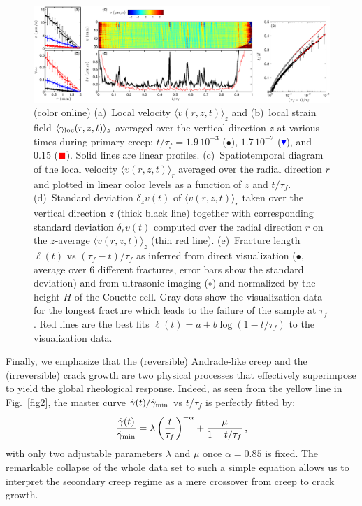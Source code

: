 \documentclass[twocolumn,superscriptaddress,showpacs,preprintnumbers,amsmath,amssymb,prl]{revtex4}
\newcommand\gp{\dot\gamma}
\newcommand\gl{\gamma_{\rm loc}}
\begin{document}
\begin{figure}
\centering
\includegraphics[width=17.5cm,clip]{Fig4.eps}
\caption{(color online) (a)~Local velocity $\langle v(r,z,t)\rangle_z$ and (b)~local strain field $\langle\gl(r,z,t)\rangle_z$ averaged over the vertical direction $z$ at various times during primary creep: $t/\tau_f=1.9\,10^{-3}$ ($\bullet$), $1.7\,10^{-2}$ (\textcolor{blue}{$\blacktriangledown$}), and 0.15 (\textcolor{red}{$\blacksquare$}). Solid lines are linear profiles. (c)~Spatiotemporal diagram of the local velocity $\langle v(r,z,t)\rangle_r$ averaged over the radial direction $r$ and plotted in linear color levels as a function of $z$ and $t/\tau_f$. (d)~Standard deviation $\delta_z v(t)$ of $\langle v(r,z,t)\rangle_r$ taken over the vertical direction $z$ (thick black line) together with corresponding standard deviation $\delta_r v(t)$ computed over the radial direction $r$ on the $z$-average $\langle v(r,z,t)\rangle_z$ (thin red line). (e)~Fracture length $\ell(t)$ vs $(\tau_f-t)/\tau_f$ as inferred from direct visualization ($\bullet$, average over 6 different fractures, error bars show the standard deviation) and from ultrasonic imaging ($\circ$) and normalized by the height $H$ of the Couette cell. Gray dots show the visualization data for the longest fracture which leads to the failure of the sample at $\tau_f$. Red lines are the best fits $\ell(t)=a+b\log(1-t/\tau_f)$ to the visualization data.
\label{fig4}}
\end{figure} 

Finally, we emphasize that the (reversible) Andrade-like creep and the (irreversible) crack growth are two  physical processes that effectively superimpose to yield the global rheological response. Indeed, as seen from the yellow line in Fig.~\ref{fig2}, the master curve $\gp(t)/\gp_{\rm min}$ vs $t/\tau_f$ is perfectly fitted by:
\begin{equation}
\frac{\gp(t)}{\gp_{\rm min}}=\lambda \left(\frac{t}{\tau_f}\right)^{-\alpha}+ \frac{\mu}{1-t/\tau_f}\,,
\label{e.fit}
\end{equation}
with only two adjustable parameters $\lambda$ and $\mu$ once $\alpha=0.85$ is fixed. The remarkable collapse of the whole data set to such a simple equation allows us to interpret the secondary creep regime as a mere crossover from creep to crack growth.
\end{document}
